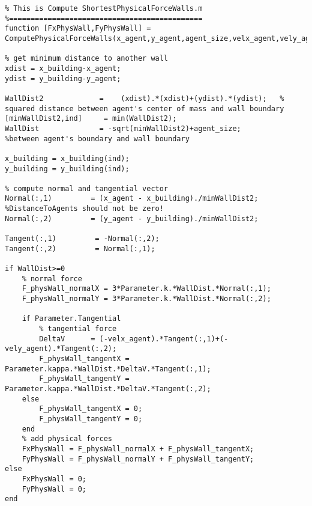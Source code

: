 \lstset{basicstyle=\footnotesize\ttfamily}
    
\begin{lstlisting}[breaklines]
%=============================================
% This is Compute ShortestPhysicalForceWalls.m
%=============================================
function [FxPhysWall,FyPhysWall] = ComputePhysicalForceWalls(x_agent,y_agent,agent_size,velx_agent,vely_agent,x_building,y_building,Parameter)

% get minimum distance to another wall
xdist = x_building-x_agent;
ydist = y_building-y_agent;

WallDist2             =    (xdist).*(xdist)+(ydist).*(ydist); 	% squared distance between agent's center of mass and wall boundary
[minWallDist2,ind]     = min(WallDist2);
WallDist              = -sqrt(minWallDist2)+agent_size;                            %between agent's boundary and wall boundary

x_building = x_building(ind);
y_building = y_building(ind);

% compute normal and tangential vector
Normal(:,1)         = (x_agent - x_building)./minWallDist2;  %DistanceToAgents should not be zero!
Normal(:,2)         = (y_agent - y_building)./minWallDist2;

Tangent(:,1)         = -Normal(:,2);
Tangent(:,2)         = Normal(:,1);

if WallDist>=0
    % normal force
    F_physWall_normalX = 3*Parameter.k.*WallDist.*Normal(:,1);
    F_physWall_normalY = 3*Parameter.k.*WallDist.*Normal(:,2);

    if Parameter.Tangential
        % tangential force
        DeltaV      = (-velx_agent).*Tangent(:,1)+(-vely_agent).*Tangent(:,2);
        F_physWall_tangentX = Parameter.kappa.*WallDist.*DeltaV.*Tangent(:,1);
        F_physWall_tangentY = Parameter.kappa.*WallDist.*DeltaV.*Tangent(:,2);
    else
        F_physWall_tangentX = 0;
        F_physWall_tangentY = 0;
    end
    % add physical forces
    FxPhysWall = F_physWall_normalX + F_physWall_tangentX;
    FyPhysWall = F_physWall_normalY + F_physWall_tangentY;
else
    FxPhysWall = 0;
    FyPhysWall = 0;
end
\end{lstlisting}
    
